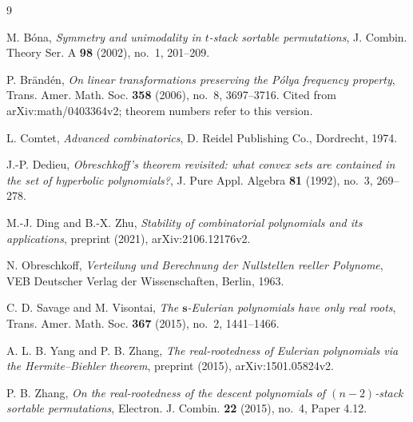\documentclass{amsart}
\theoremstyle{remark}
\numberwithin{equation}{section}
\begin{document}
\begin{thebibliography}{9}

M. B\'ona, \emph{Symmetry and unimodality in $t$-stack sortable
permutations}, J. Combin. Theory Ser. A \textbf{98} (2002), no.~1, 201--209.

P. Br\"and\'en, \emph{On linear transformations preserving the P\'olya
frequency property}, Trans. Amer. Math. Soc. \textbf{358} (2006), no.~8,
3697--3716. Cited from arXiv:math/0403364v2; theorem numbers refer to
this version.

L. Comtet, \emph{Advanced combinatorics}, D. Reidel Publishing Co.,
Dordrecht, 1974.

J.-P. Dedieu, \emph{Obreschkoff's theorem revisited: what convex sets are
contained in the set of hyperbolic polynomials?}, J. Pure Appl. Algebra
\textbf{81} (1992), no.~3, 269--278.

M.-J. Ding and B.-X. Zhu, \emph{Stability of combinatorial polynomials and
its applications}, preprint (2021), arXiv:2106.12176v2.

N. Obreschkoff, \emph{Verteilung und Berechnung der Nullstellen reeller
Polynome}, VEB Deutscher Verlag der Wissenschaften, Berlin, 1963.

C. D. Savage and M. Visontai, \emph{The $\mathbf{s}$-Eulerian polynomials
have only real roots}, Trans. Amer. Math. Soc. \textbf{367} (2015), no.~2,
1441--1466.

A. L. B. Yang and P. B. Zhang, \emph{The real-rootedness of Eulerian
polynomials via the Hermite--Biehler theorem}, preprint (2015),
arXiv:1501.05824v2.

P. B. Zhang, \emph{On the real-rootedness of the descent polynomials of
$(n-2)$-stack sortable permutations}, Electron. J. Combin. \textbf{22}
(2015), no.~4, Paper 4.12.

\end{thebibliography}
\end{document}
